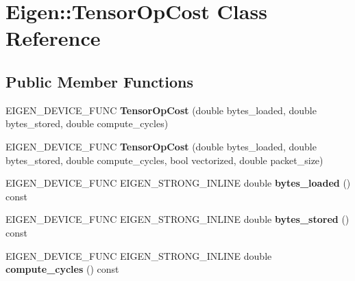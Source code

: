 \hypertarget{class_eigen_1_1_tensor_op_cost}{}\section{Eigen\+:\+:Tensor\+Op\+Cost Class Reference}
\label{class_eigen_1_1_tensor_op_cost}
\subsection*{Public Member Functions}
\begin{DoxyCompactItemize}
\item 
\mbox{\label{class_eigen_1_1_tensor_op_cost_a28957e6eb06dc8d5b36aa54d6b5d908f}} 
E\+I\+G\+E\+N\+\_\+\+D\+E\+V\+I\+C\+E\+\_\+\+F\+U\+NC {\bfseries Tensor\+Op\+Cost} (double bytes\+\_\+loaded, double bytes\+\_\+stored, double compute\+\_\+cycles)
\item 
\mbox{\label{class_eigen_1_1_tensor_op_cost_acb9efb295137bd79a37936952247e5c3}} 
E\+I\+G\+E\+N\+\_\+\+D\+E\+V\+I\+C\+E\+\_\+\+F\+U\+NC {\bfseries Tensor\+Op\+Cost} (double bytes\+\_\+loaded, double bytes\+\_\+stored, double compute\+\_\+cycles, bool vectorized, double packet\+\_\+size)
\item 
\mbox{\label{class_eigen_1_1_tensor_op_cost_ab219b63415092d08e09310471cf6fc23}} 
E\+I\+G\+E\+N\+\_\+\+D\+E\+V\+I\+C\+E\+\_\+\+F\+U\+NC E\+I\+G\+E\+N\+\_\+\+S\+T\+R\+O\+N\+G\+\_\+\+I\+N\+L\+I\+NE double {\bfseries bytes\+\_\+loaded} () const
\item 
\mbox{\label{class_eigen_1_1_tensor_op_cost_a5d813f65797b15c9da19d23ae7ceb5eb}} 
E\+I\+G\+E\+N\+\_\+\+D\+E\+V\+I\+C\+E\+\_\+\+F\+U\+NC E\+I\+G\+E\+N\+\_\+\+S\+T\+R\+O\+N\+G\+\_\+\+I\+N\+L\+I\+NE double {\bfseries bytes\+\_\+stored} () const
\item 
\mbox{\label{class_eigen_1_1_tensor_op_cost_ac24758ad7deef1e3968f66eb33eaf139}} 
E\+I\+G\+E\+N\+\_\+\+D\+E\+V\+I\+C\+E\+\_\+\+F\+U\+NC E\+I\+G\+E\+N\+\_\+\+S\+T\+R\+O\+N\+G\+\_\+\+I\+N\+L\+I\+NE double {\bfseries compute\+\_\+cycles} () const
\item 
\mbox{\label{class_eigen_1_1_tensor_op_cost_ae7caee524a30c15d68c781ea5f063ead}} 

\end{DoxyCompactItemize}
